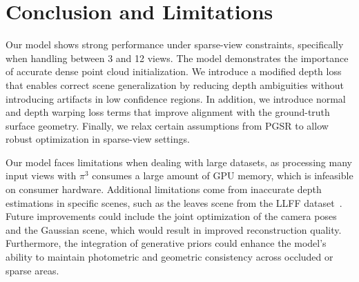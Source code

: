 \section{Conclusion and Limitations}
Our model shows strong performance under sparse-view constraints, specifically when handling between 3 and 12 views.
The model demonstrates the importance of accurate dense point cloud initialization.
We introduce a modified depth loss that enables correct scene generalization by reducing depth ambiguities without introducing artifacts in low confidence regions.
In addition, we introduce normal and depth warping loss terms that improve alignment with the ground-truth surface geometry. Finally, we relax certain assumptions from PGSR to allow robust optimization in sparse-view settings.

Our model faces limitations when dealing with large datasets, as processing many input views with $\pi^3$ consumes a large amount of GPU memory, which is infeasible on consumer hardware. Additional limitations come from inaccurate depth estimations in specific scenes, such as the leaves scene from the LLFF dataset~\cite{mildenhall2019llff}. Future improvements could include the joint optimization of the camera poses and the Gaussian scene, which would result in improved reconstruction quality. Furthermore, the integration of generative priors could enhance the model's ability to maintain photometric and geometric consistency across occluded or sparse areas.
\FloatBarrier